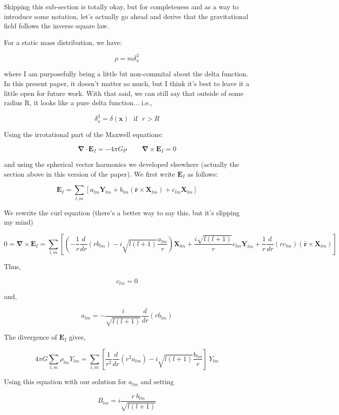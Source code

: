 \documentclass {article}
\renewcommand\vec{\mathbf}
\let\OldS\nabla
\renewcommand{\nabla}{\boldsymbol{\OldS}}
\let\OldHat\hat
\renewcommand{\hat}[1]{\OldHat{\mathbf{#1}}}
\begin{document}
Skipping this sub-section is totally okay, but for completeness and as a way to introduce some notation, let's actually go ahead and derive that the gravitational field follows the inverse square law. 

For a static mass distribution, we have:

$$\rho = m \delta^3_x  $$

where I am purposefully being a little bit non-commital about the delta function. In this present paper, it doesn't matter so much, but I think it's best to leave it a little open for future work. With that said, we can still say that outside of some radius R, it looks like a pure delta function... i.e.,

$$\delta^3_x = \delta(\vec x) ~~~ \textrm{if} ~~~ r > R $$

Using the irrotational part of the Maxwell equations:

$$\nabla \cdot \vec{E}_I = -4 \pi G \rho ~~~~~~~~~~ \nabla \times \vec{E}_I = 0$$

and using the spherical vector harmonics we developed elsewhere (actually the section above in this version of the paper).  We first write $\vec E_I $ as follows:

$$\vec E_I =  \sum_{l,m} \left[a_{lm}\vec Y_{lm} +b_{lm} (\hat r \times \vec X_{lm}) +c_{lm}\vec X_{lm} \right] $$

We rewrite the curl equation (there's a better way to say this, but it's slipping my mind)

$$ 0 = \nabla \times \vec E_I  = \sum_{l, m} \left[ \left( - \frac 1 r \frac d {dr} (r b_{lm}) - i \sqrt {l ( l +1)}  \frac {a_{lm} } r \right) \vec X_{lm} + \frac {i \sqrt {l(l+1)} } r c_{lm} \vec Y_{lm} + \frac 1 r \frac d {dr} (r c_{lm}) (\hat r \times \vec X_{lm}) \right] $$

Thus,

$$ c_{lm} = 0 $$

and,

$$a_{lm} = - \frac i {\sqrt{l(l+1)} }\frac d {dr} (r b_{lm}) $$

The divergence of $\vec E_I$ gives,

$$ 4 \pi G \sum_{l, m} \rho_{lm} Y_{lm} = \sum_{l, m} \left[ \frac 1 {r^2} \frac d {dr} (r^2 a_{lm} ) - i \sqrt{l(l+1)} \frac {b_{lm}} r  \right] ~ Y_{lm} $$

Using this equation with our solution for $a_{lm}$ and setting 

$$B_{lm} = i \frac {r ~ b_{lm}} {\sqrt {l (l+1)}} $$
\end{document}
